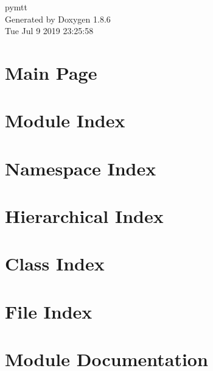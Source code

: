\documentclass[twoside]{book}
\newcommand{\clearemptydoublepage}{%
  \newpage{\pagestyle{empty}\cleardoublepage}%
}
\begin{document}
\hypersetup{pageanchor=false}
\begin{titlepage}
\vspace*{7cm}
\begin{center}%
{\Large pymtt }\\
\vspace*{1cm}
{\large Generated by Doxygen 1.8.6}\\
\vspace*{0.5cm}
{\small Tue Jul 9 2019 23:25:58}\\
\end{center}
\end{titlepage}
\clearemptydoublepage
\tableofcontents
\clearemptydoublepage
{}
\hypersetup{pageanchor=true}

\chapter{Main Page}
\label{index}\hypertarget{index}{}
\chapter{Module Index}

\chapter{Namespace Index}

\chapter{Hierarchical Index}

\chapter{Class Index}

\chapter{File Index}

\chapter{Module Documentation}






















\end{document}
